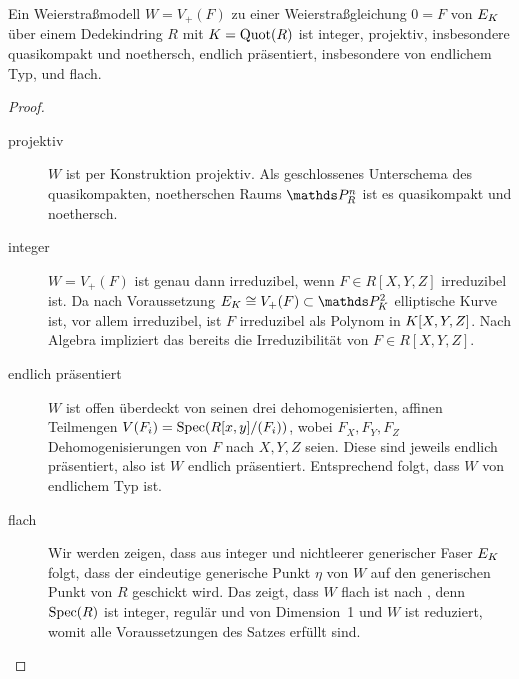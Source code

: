 \begin{Lemma}\label{thm:eigweierstrassmodelle}
  Ein Weierstraßmodell $W=V_+(F)$ zu einer Weierstraßgleichung $0=F$
  von $E_{K}$ über einem Dedekindring $R$ mit $K=\operatorname{Quot}(R)$ ist
  integer,
  projektiv, insbesondere quasikompakt und noethersch,
  endlich präsentiert, insbesondere von endlichem Typ, und
  flach.
  \begin{proof}
    \begin{description}
    \item[projektiv] $W$ ist per Konstruktion projektiv. Als
      geschlossenes Unterschema des quasikompakten, noetherschen Raums
      $\P_R^n$ ist es quasikompakt und noethersch.
    \item[integer]
      $W=V_+(F)$ ist genau dann irreduzibel, wenn $F\in R[X,Y,Z]$
      irreduzibel ist.
      Da nach Voraussetzung $E_\K\cong V_+(F)\subset\P_\K^2$
      elliptische Kurve ist, vor allem irreduzibel, ist $F$ irreduzibel
      als Polynom in $K[X,Y,Z]$. Nach Algebra impliziert das bereits
      die Irreduzibilität von $F\in R[X,Y,Z]$.
    \item[endlich präsentiert]
      $W$ ist offen überdeckt von seinen drei dehomogenisierten,
      affinen Teilmengen $V(F_i)=\operatorname{Spec}(R[x,y]/(F_i))$, wobei $F_X,F_Y,F_Z$
      Dehomogenisierungen von $F$ nach $X,Y,Z$ seien. Diese sind jeweils
      endlich präsentiert, also ist $W$ endlich präsentiert.
      Entsprechend folgt, dass $W$ von endlichem Typ ist.
    \item[flach]
      Wir werden zeigen, dass aus integer und nichtleerer generischer
      Faser $E_{K}$ folgt, dass der eindeutige generische Punkt $\eta$
      von $W$ auf den generischen Punkt von $R$ geschickt wird.
      Das zeigt, dass $W$ flach ist
      nach \cite[Proposition III.9.7]{hartshorne}, denn
      $\operatorname{Spec}(R)$ ist integer, regulär und von Dimension~1 und
      $W$ ist reduziert, womit alle Voraussetzungen des Satzes erfüllt
      sind.
      

\end{description}
\end{proof}
\end{Lemma}
